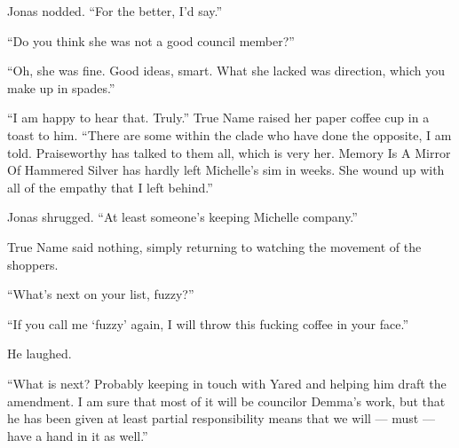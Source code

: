 Jonas nodded. ``For the better, I'd say.''

``Do you think she was not a good council member?''

``Oh, she was fine. Good ideas, smart. What she lacked was direction, which you make up in spades.''

``I am happy to hear that. Truly.'' True Name raised her paper coffee cup in a toast to him. ``There are some within the clade who have done the opposite, I am told. Praiseworthy has talked to them all, which is very her. Memory Is A Mirror Of Hammered Silver has hardly left Michelle's sim in weeks. She wound up with all of the empathy that I left behind.''

Jonas shrugged. ``At least someone's keeping Michelle company.''

True Name said nothing, simply returning to watching the movement of the shoppers.

``What's next on your list, fuzzy?''

``If you call me `fuzzy' again, I will throw this fucking coffee in your face.''

He laughed.

``What is next? Probably keeping in touch with Yared and helping him draft the amendment. I am sure that most of it will be councilor Demma's work, but that he has been given at least partial responsibility means that we will — must — have a hand in it as well.''
